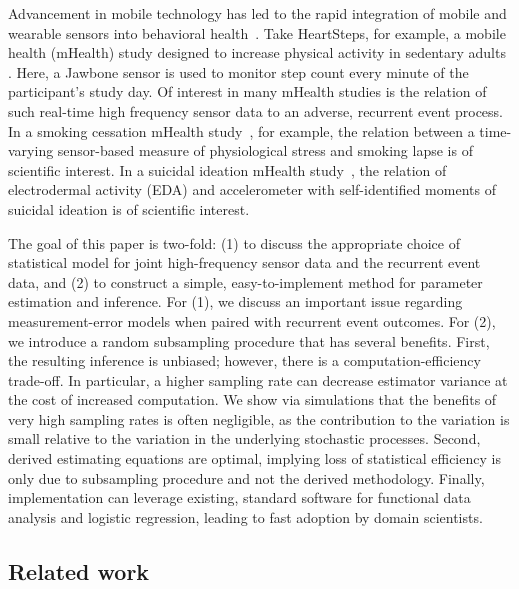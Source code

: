 \documentclass[12pt]{amsart}
\begin{document}
Advancement in mobile technology has led to the rapid integration of mobile and wearable sensors into behavioral health~\citep{Freeetal2013}. Take HeartSteps, for example, a mobile health (mHealth) study designed to increase physical activity in sedentary adults \citep{KlasnjaHS2019}. Here, a Jawbone sensor is used to monitor step count every minute of the participant's study day. Of interest in many mHealth studies is the relation of such real-time high frequency sensor data to an adverse, recurrent event process. In a smoking cessation mHealth study~\citep{Sense2Stop}, for example, the relation between a time-varying sensor-based measure of physiological stress and smoking lapse is of scientific interest. In a suicidal ideation mHealth study~\citep{Kleiman2018}, the relation of electrodermal activity (EDA) and accelerometer with self-identified moments of suicidal ideation is of scientific interest.

The goal of this paper is two-fold: (1) to discuss the appropriate choice of statistical model for joint high-frequency sensor data and the recurrent event data, and (2) to construct a simple, easy-to-implement method for parameter estimation and inference. For (1), we discuss an important issue regarding measurement-error models when paired with recurrent event outcomes. For (2), we introduce a random subsampling procedure that has several benefits.  First, the resulting inference is unbiased; however, there is a computation-efficiency trade-off. In particular, a higher sampling rate can decrease estimator variance at the cost of increased computation.  We show via simulations that the benefits of very high sampling rates is often negligible, as the contribution to the variation is small relative to the variation in the underlying stochastic processes. Second, derived estimating equations are optimal, implying loss of statistical efficiency is only due to subsampling procedure and not the derived methodology.  Finally, implementation can leverage existing, standard software for functional data analysis and logistic regression, leading to fast adoption by domain scientists.

\subsection{Related work}
\end{document}
